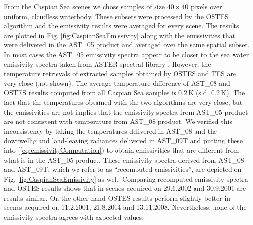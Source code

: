 From the Caspian Sea scenes we chose samples of size $40 \times 40$ pixels over uniform, cloudless waterbody. These subsets were processed by the OSTES algorithm and the emissivity results were averaged for every scene. The results are plotted in Fig. \ref{fig:CaspianSeaEmissivity} along with the emissivities that were delivered in the AST\_05 product and averaged over the same spatial subset. In most cases the AST\_05 emissivity spectra appear to be closer to the sea water emissivity spectra taken from ASTER spectral library \cite{BH09}. However, the temperature retrievals of extracted samples obtained by OSTES and TES are very close (not shown). The average temperature difference of AST\_08 and OSTES results computed from all Caspian Sea samples is 0.2\,K (s.d. 0.2\,K). The fact that the temperatures obtained with the two algorithms are very close, but the emissivities are not implies that the emissivity spectra from AST\_05 product are not consistent with temperature from AST\_08 product. We verified this inconsistency by taking the temperatures delivered in AST\_08 and the downwellig and land-leaving radiances delivered in AST\_09T and putting these into (\ref{eq:emissivityComputation}) to obtain emissivities that are different from what is in the AST\_05 product. These emissivity spectra derived from AST\_08 and AST\_09T, which we refer to as ``recomputed emissivities'', are depicted on Fig. \ref{fig:CaspianSeaEmissivity} as well. Comparing recomputed emissivity spectra and OSTES results shows that in scenes acquired on 29.6.2002 and 30.9.2001 are results similar. On the other hand OSTES results perform slightly better in scenes acquired on 11.2.2001, 21.8.2004 and 13.11.2008. Nevertheless, none of the emissivity spectra agrees with expected values.

